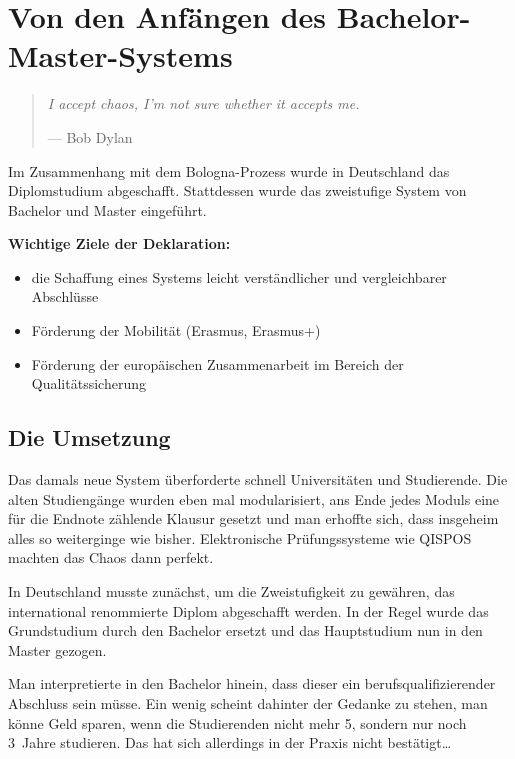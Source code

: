 \section{Von den Anfängen des Bachelor-Master-Systems}

\begin{multicols}{2}
\begin{quote}
	\textit{\foreignlanguage{english}{I accept chaos, I'm not sure whether it accepts me.}}
	
	\hfill--- Bob Dylan
\end{quote}
Im Zusammenhang mit dem Bologna-Prozess wurde in Deutschland das Diplomstudium abgeschafft.
Stattdessen wurde das zweistufige System von Bachelor und Master eingeführt.

\textbf{Wichtige Ziele der Deklaration:}
\begin{itemize}
	\item die Schaffung eines Systems leicht verständlicher und vergleichbarer Abschlüsse
	\item Förderung der Mobilität (Erasmus, Erasmus+)
	\item Förderung der europäischen Zusammenarbeit im Bereich der Qualitätssicherung
\end{itemize}

\subsection{Die Umsetzung}
Das damals neue System überforderte schnell Universitäten und Studierende.
Die alten Studiengänge wurden eben mal modularisiert, ans Ende jedes Moduls eine für die Endnote zählende Klausur gesetzt und man erhoffte sich, dass insgeheim alles so weiterginge wie bisher.
Elektronische Prüfungssysteme wie QISPOS machten das Chaos dann perfekt.

In Deutschland musste zunächst, um die Zweistufigkeit zu gewähren, das international renommierte Diplom abgeschafft werden.
In der Regel wurde das Grundstudium durch den Bachelor ersetzt und das Hauptstudium nun in den Master gezogen.

Man interpretierte in den Bachelor hinein, dass dieser ein berufsqualifizierender Abschluss sein müsse.
Ein wenig scheint dahinter der Gedanke zu stehen, man könne Geld sparen, wenn die Studierenden nicht mehr 5, sondern nur noch 3~Jahre studieren.
Das hat sich allerdings in der Praxis nicht bestätigt\dots


\end{multicols}
